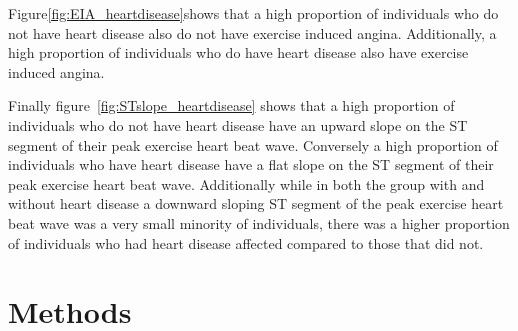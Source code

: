 \documentclass[12pt]{article}
\begin{document}
Figure\ref*{fig:EIA_heartdisease}shows that a high proportion of individuals who do not have heart disease also do not have exercise induced angina. Additionally, a high proportion of individuals who do have heart disease also have exercise induced angina. 

Finally figure~\ref*{fig:STslope_heartdisease} shows that a high proportion of individuals who do not have heart disease have an upward slope on the ST segment of their peak exercise heart beat wave. Conversely a high proportion of individuals who have heart disease have a flat slope on the ST segment of their peak exercise heart beat wave. Additionally while in both the group with and without heart disease a downward sloping ST segment of the peak exercise heart beat wave was a very small minority of individuals, there was a higher proportion of individuals who had heart disease  affected compared to those that did not. \par 




\section{Methods}
\label{sec:meth}
\end{document}
